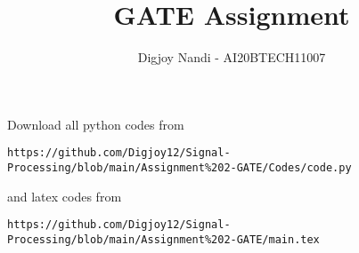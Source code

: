 \documentclass[journal,12pt,twocolumn]{IEEEtran}
\DeclareMathOperator*{\Res}{Res}
\begin{document}
\newcommand{\BEQA}{\begin{eqnarray}}
\newcommand{\EEQA}{\end{eqnarray}}
\newcommand{\define}{\stackrel{\triangle}{=}}

\raggedbottom
\setlength{\parindent}{0pt}
\providecommand{\mbf}{\mathbf}
\providecommand{\pr}[1]{\ensuremath{\Pr\left(#1\right)}}
\providecommand{\qfunc}[1]{\ensuremath{Q\left(#1\right)}}
\providecommand{\sbrak}[1]{\ensuremath{{}\left[#1\right]}}
\providecommand{\lsbrak}[1]{\ensuremath{{}\left[#1\right.}}
\providecommand{\rsbrak}[1]{\ensuremath{{}\left.#1\right]}}
\providecommand{\brak}[1]{\ensuremath{\left(#1\right)}}
\providecommand{\lbrak}[1]{\ensuremath{\left(#1\right.}}
\providecommand{\rbrak}[1]{\ensuremath{\left.#1\right)}}
\providecommand{\cbrak}[1]{\ensuremath{\left\{#1\right\}}}
\providecommand{\lcbrak}[1]{\ensuremath{\left\{#1\right.}}
\providecommand{\rcbrak}[1]{\ensuremath{\left.#1\right\}}}
\theoremstyle{remark}
\newtheorem{rem}{Remark}
\newcommand{\sgn}{\mathop{\mathrm{sgn}}}
\providecommand{\abs}[1]{\vert#1\vert}
\providecommand{\res}[1]{\Res\displaylimits_{#1}} 
\providecommand{\norm}[1]{\lVert#1\rVert}
\providecommand{\mtx}[1]{\mathbf{#1}}
\providecommand{\mean}[1]{E[ #1 ]}
\providecommand{\fourier}{\overset{\mathcal{F}}{ \rightleftharpoons}}
\providecommand{\system}{\overset{\mathcal{H}}{ \longleftrightarrow}}
\newcommand{\solution}{\noindent \textbf{Solution: }}
\newcommand{\cosec}{\,\text{cosec}\,}
\providecommand{\dec}[2]{\ensuremath{\overset{#1}{\underset{#2}{\gtrless}}}}
\newcommand{\myvec}[1]{\ensuremath{\begin{pmatrix}#1\end{pmatrix}}}
\newcommand{\mydet}[1]{\ensuremath{\begin{vmatrix}#1\end{vmatrix}}}
\makeatletter
{}
\makeatother
\let\StandardTheFigure\thefigure
\let\vec\mathbf
\renewcommand{\thefigure}{\theproblem}
\def\putbox#1#2#3{\makebox[0in][l]{\makebox[#1][l]{}\raisebox{\baselineskip}[0in][0in]{\raisebox{#2}[0in][0in]{#3}}}}
     \def\rightbox#1{\makebox[0in][r]{#1}}
     \def\centbox#1{\makebox[0in]{#1}}
     \def\topbox#1{\raisebox{-\baselineskip}[0in][0in]{#1}}
     \def\midbox#1{\raisebox{-0.5\baselineskip}[0in][0in]{#1}}
\vspace{3cm}
\title{GATE Assignment}
\author{Digjoy Nandi - AI20BTECH11007}
\maketitle
\newpage
\bigskip
\renewcommand{\thefigure}{\theenumi}
\renewcommand{\thetable}{\theenumi}
Download all python codes from 
\begin{lstlisting}
https://github.com/Digjoy12/Signal-Processing/blob/main/Assignment%202-GATE/Codes/code.py
\end{lstlisting}
%
and latex codes from 
%
\begin{lstlisting}
https://github.com/Digjoy12/Signal-Processing/blob/main/Assignment%202-GATE/main.tex
\end{lstlisting}
\end{document}

